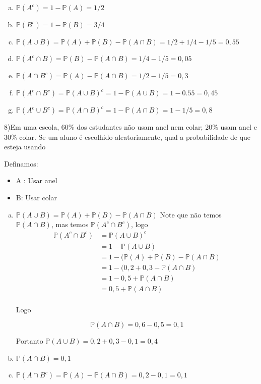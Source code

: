 \documentclass{article}
\begin{document}
\begin{enumerate}[a)] %
    \item $\mathds{P}(A^c) = 1 - \mathds{P}(A) = 1/2$
    \item $\mathds{P}(B^c) = 1 - \mathds{P}(B) = 3/4$
    \item $\mathds{P}(A \cup B) = \mathds{P}(A) + \mathds{P}(B) - \mathds{P}(A\cap B) = 1/2 + 1/4 - 1/5 = 0,55$
    \item $\mathds{P}(A^c \cap B) = \mathds{P}(B) - \mathds{P}(A \cap B) = 1/4 - 1/5 = 0,05$
    \item $\mathds{P}(A \cap B^c) = \mathds{P}(A) - \mathds{P}(A \cap B) = 1/2 - 1/5 = 0,3$
    \item $\mathds{P}(A^c \cap B^c) =\mathds{P}(A \cup B)^c  = 1 - \mathds{P}(A \cup B) = 1 - 0.55 = 0,45$
    \item $\mathds{P}(A^c \cup B^c) = \mathds{P}(A \cap B)^c =  1 - \mathds{P}(A \cap B) = 1 - 1/5 = 0,8$
\end{enumerate}

\vspace{5px}

8)Em uma escola, 60\% dos estudantes não usam anel nem colar; 20\% usam anel e 30\%
colar. Se um aluno é escolhido aleatoriamente, qual a probabilidade de que esteja usando

Definamos:

\begin{itemize}
    \item A : Usar anel
    \item B: Usar colar
\end{itemize}
\begin{enumerate}[a)] %
    \item $\mathds{P}(A \cup B) = \mathds{P}(A) + \mathds{P}(B) - \mathds{P}(A \cap B)$
    Note que não temos $\mathds{P}(A \cap B)$, mas temos $\mathds{P}(A^c \cap B^c)$, logo
    \begin{align*}
        \mathds{P}(A^c \cap B^c) &= \mathds{P}(A \cup B)^c\\
        &= 1 - \mathds{P}(A \cup B)\\
        &= 1 - (\mathds{P}(A) + \mathds{P}(B) - \mathds{P}(A \cap B)\\
        &= 1 - (0,2 + 0,3 - \mathds{P}(A \cap B)\\
        &= 1 - 0,5  + \mathds{P}(A \cap B)\\
        &= 0,5  + \mathds{P}(A \cap B)\\
    \end{align*}

    Logo

    $$\mathds{P}(A \cap B) = 0,6 - 0,5 = 0,1$$

    Portanto
    $\mathds{P}(A \cup B) = 0,2 + 0,3 - 0,1 = 0,4$
    \item $\mathds{P}(A \cap B) = 0,1$
    \item $\mathds{P}(A \cap B^c) = \mathds{P}(A) - \mathds{P}(A \cap B) = 0,2 - 0,1 = 0,1$
\end{enumerate}
\end{document}
